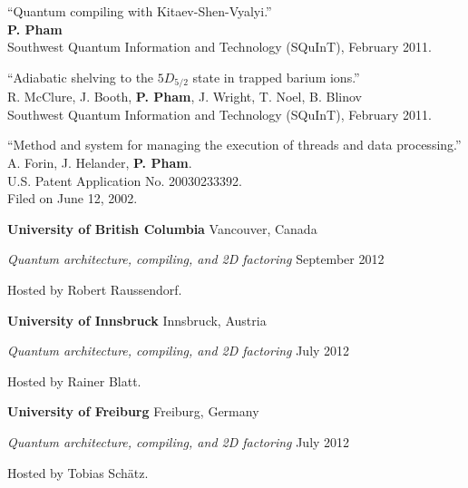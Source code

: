 \documentclass[letter]{article}
\begin{document}
\vspace{\baselineskip}
\par
``Quantum compiling with Kitaev-Shen-Vyalyi.''\\
\textbf{P. Pham}\\
Southwest Quantum Information and Technology (SQuInT), February 2011.

\vspace{\baselineskip}
\par
``Adiabatic shelving to the $5D_{5/2}$ state in trapped barium ions.''\\
R. McClure, J. Booth, \textbf{P. Pham}, J. Wright, T. Noel, B. Blinov\\
Southwest Quantum Information and Technology (SQuInT), February 2011.

\vspace{\baselineskip}

``Method and system for managing the execution of threads and data processing.''
\\
A. Forin, J. Helander, \textbf{P. Pham}.\\
U.S. Patent Application No. 20030233392.\\
Filed on June 12, 2002.

\pagebreak

\vspace{\baselineskip}
\par
{\bf {University of British Columbia}} \hfill Vancouver, Canada
\par
{\em Quantum architecture, compiling, and 2D factoring} \hfill September 2012
\par
Hosted by Robert Raussendorf.

\vspace{\baselineskip}
\par
{\bf {University of Innsbruck}} \hfill Innsbruck, Austria
\par
{\em Quantum architecture, compiling, and 2D factoring} \hfill July 2012
\par
Hosted by Rainer Blatt.

\vspace{\baselineskip}
\par
{\bf {University of Freiburg}} \hfill Freiburg, Germany
\par
{\em Quantum architecture, compiling, and 2D factoring} \hfill July 2012
\par
Hosted by Tobias Sch\"atz.
\end{document}
